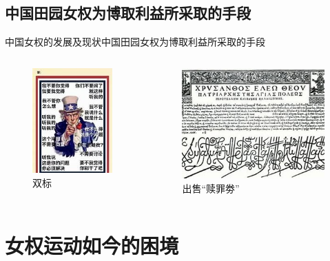 \documentclass{beamer}
\begin{document}
	\subsection*{中国田园女权为博取利益所采取的手段}
	\begin{frame}{中国女权的发展及现状}{中国田园女权为博取利益所采取的手段}
		\begin{columns}
			\begin{figure}
				\centering
				\includegraphics{img/图片3.jpg}
				\caption{双标}
			\end{figure}

			\begin{figure}
				\centering
				\includegraphics{img/图片4.jpg}
				\caption{出售“赎罪劵”}
			\end{figure}
		\end{columns}
	\end{frame}


	\section{女权运动如今的困境}
\end{document}
